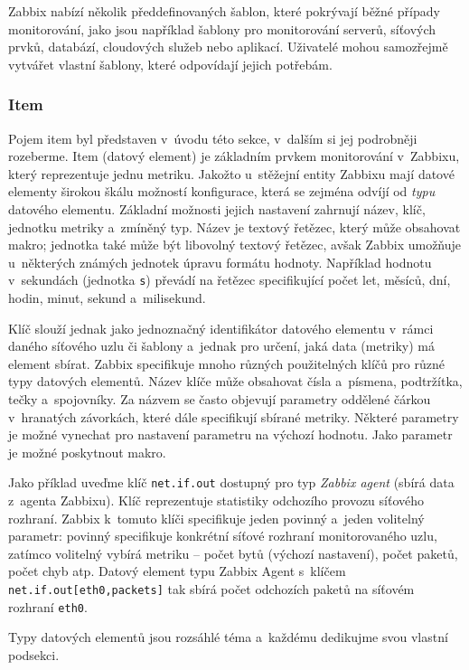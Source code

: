 \documentclass[czech, ing, kiv, he, iso690]{fasthesis}
\begin{document}
Zabbix nabízí několik předdefinovaných šablon, které pokrývají běžné případy monitorování, jako jsou například šablony pro monitorování serverů, síťových prvků, databází, cloudových služeb nebo aplikací. Uživatelé mohou samozřejmě vytvářet vlastní šablony, které odpovídají jejich potřebám.

\subsubsection{Item}
Pojem item byl představen v~úvodu této sekce, v~dalším si jej podrobněji rozeberme. Item (datový element) je základním prvkem monitorování v~Zabbixu, který reprezentuje jednu metriku. Jakožto u~stěžejní entity Zabbixu mají datové elementy širokou škálu možností konfigurace, která se zejména odvíjí od \emph{typu} datového elementu. Základní možnosti jejich nastavení zahrnují název, klíč, jednotku metriky a~zmíněný typ. Název je textový řetězec, který může obsahovat makro; jednotka také může být libovolný textový řetězec, avšak Zabbix umožňuje u~některých známých jednotek úpravu formátu hodnoty. Například hodnotu v~sekundách (jednotka \texttt{s}) převádí na řetězec specifikující počet let, měsíců, dní, hodin, minut, sekund a~milisekund.

Klíč slouží jednak jako jednoznačný identifikátor datového elementu v~rámci daného síťového uzlu či šablony a~jednak pro určení, jaká data (metriky) má element sbírat. Zabbix specifikuje mnoho různých použitelných klíčů pro různé typy datových elementů. Název klíče může obsahovat čísla a~písmena, podtržítka, tečky a~spojovníky. Za názvem se často objevují parametry oddělené čárkou v~hranatých závorkách, které dále specifikují sbírané metriky. Některé parametry je možné vynechat pro nastavení parametru na výchozí hodnotu. Jako parametr je možné poskytnout makro. 

Jako příklad uveďme klíč \texttt{net.if.out} dostupný pro typ \emph{Zabbix agent} (sbírá data z~agenta Zabbixu). Klíč reprezentuje statistiky odchozího provozu síťového rozhraní. Zabbix k~tomuto klíči specifikuje jeden povinný a~jeden volitelný parametr: povinný specifikuje konkrétní síťové rozhraní monitorovaného uzlu, zatímco volitelný vybírá metriku -- počet bytů (výchozí nastavení), počet paketů, počet chyb atp. Datový element typu Zabbix Agent s~klíčem \texttt{net.if.out[eth0,packets]} tak sbírá počet odchozích paketů na síťovém rozhraní \texttt{eth0}.

Typy datových elementů jsou rozsáhlé téma a~každému dedikujme svou vlastní podsekci.
\end{document}
